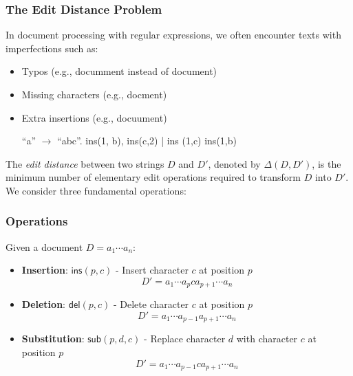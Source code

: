 \documentclass{article}
\begin{document}
%
%

\subsubsection{The Edit Distance Problem}
In document processing with regular expressions, we often encounter texts with imperfections such as:
\begin{itemize}
    \item Typos (e.g., documment instead of document)
    \item Missing characters (e.g., docment)
    \item Extra insertions (e.g., docuument)


    ``a'' $\rightarrow$ ``abc''.  ins(1, b), ins(c,2) | ins (1,c) ins(1,b)


\end{itemize}

The \emph{edit distance} between two strings $D$ and $D'$, denoted by $\Delta(D,D')$, is the minimum number of elementary edit operations required to transform $D$ into $D'$. We consider three fundamental operations:\\

\subsubsection{Operations}
Given a document $D = a_1 \cdots a_n$:
\begin{center}
\begin{itemize}
    \item \textbf{Insertion}: $\mathsf{ins}(p,c)$ - Insert character $c$ at position $p$
    \[ D' = a_1 \cdots a_p c a_{p+1} \cdots a_n \]
    \item \textbf{Deletion}: $\mathsf{del}(p, c)$ - Delete character $c$ at position $p$
    \[ D' = a_1 \cdots a_{p-1} a_{p+1} \cdots a_n \]
    \item \textbf{Substitution}: $\mathsf{sub}(p,d, c)$ - Replace character $d$ with character $c$ at position $p$
    \[ D' = a_1 \cdots a_{p-1} c a_{p+1} \cdots a_n \]
\end{itemize}
\end{center}
\end{document}

